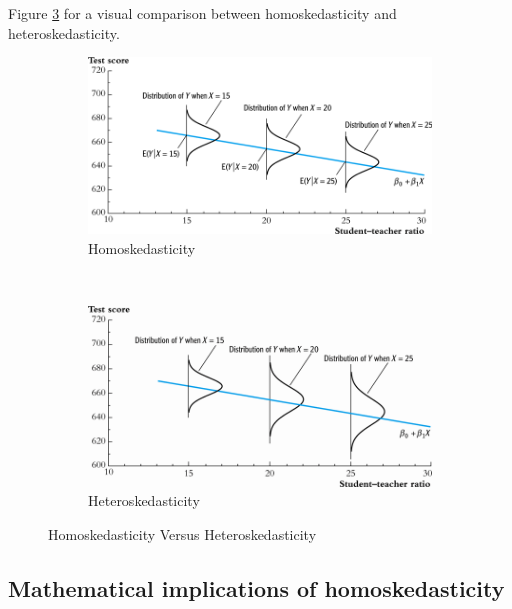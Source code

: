 \documentclass[a4paper,11pt]{article}
\begin{document}
Figure \ref{fig:homovshetero} for a visual comparison between
homoskedasticity and heteroskedasticity.

\begin{figure}
    \centering
    \begin{subfigure}[!ht]{0.85\textwidth}
        \includegraphics[width=\textwidth]{./figure/fig-4-4}
        \caption{Homoskedasticity}
        \label{fig:homo1}
    \end{subfigure}
    ~ %
    \begin{subfigure}[!ht]{0.85\textwidth}
        \includegraphics[width=\textwidth]{./figure/fig-5-2}
        \caption{Heteroskedasticity}
        \label{fig:hetero1}
    \end{subfigure}
    \caption{Homoskedasticity Versus Heteroskedasticity}\label{fig:homovshetero}
\end{figure}


\subsection{Mathematical implications of homoskedasticity}
\label{sec:org34d09a2}
\end{document}
